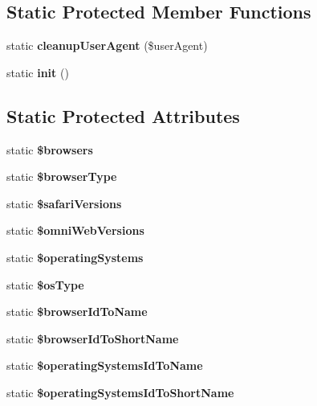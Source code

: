 \subsection*{Static Protected Member Functions}
\begin{DoxyCompactItemize}
\item 
\hypertarget{class_user_agent_parser_add41e0ac3852ff63f876e5b04fedc069}{static {\bfseries cleanup\-User\-Agent} (\$user\-Agent)}\label{class_user_agent_parser_add41e0ac3852ff63f876e5b04fedc069}

\item 
\hypertarget{class_user_agent_parser_a9f0be6ae273d3669e11c29910a0be338}{static {\bfseries init} ()}\label{class_user_agent_parser_a9f0be6ae273d3669e11c29910a0be338}

\end{DoxyCompactItemize}
\subsection*{Static Protected Attributes}
\begin{DoxyCompactItemize}
\item 
\hypertarget{class_user_agent_parser_a81edf933083b5ac5b380385f59074a7d}{static {\bfseries \$browsers}}\label{class_user_agent_parser_a81edf933083b5ac5b380385f59074a7d}

\item 
static {\bfseries \$browser\-Type}
\item 
static {\bfseries \$safari\-Versions}
\item 
static {\bfseries \$omni\-Web\-Versions}
\item 
\hypertarget{class_user_agent_parser_a6c81c14f25de6a8b8206335eea724eb1}{static {\bfseries \$operating\-Systems}}\label{class_user_agent_parser_a6c81c14f25de6a8b8206335eea724eb1}

\item 
static {\bfseries \$os\-Type}
\item 
\hypertarget{class_user_agent_parser_a1d8d7fab9e2c2974919888f5b886295e}{static {\bfseries \$browser\-Id\-To\-Name}}\label{class_user_agent_parser_a1d8d7fab9e2c2974919888f5b886295e}

\item 
\hypertarget{class_user_agent_parser_a7958078b2a0013798f14838fa1fd40c1}{static {\bfseries \$browser\-Id\-To\-Short\-Name}}\label{class_user_agent_parser_a7958078b2a0013798f14838fa1fd40c1}

\item 
\hypertarget{class_user_agent_parser_ab68e07510370828435a3e86c320c7bdc}{static {\bfseries \$operating\-Systems\-Id\-To\-Name}}\label{class_user_agent_parser_ab68e07510370828435a3e86c320c7bdc}

\item 
\hypertarget{class_user_agent_parser_ada1762b34d38d7498838252118cca041}{static {\bfseries \$operating\-Systems\-Id\-To\-Short\-Name}}\label{class_user_agent_parser_ada1762b34d38d7498838252118cca041}

\end{DoxyCompactItemize}


